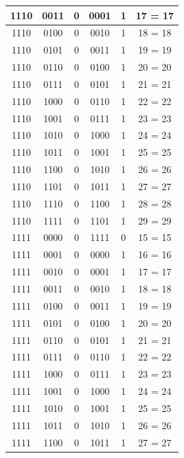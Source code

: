 \documentclass{exam}
\begin{document}
\begin{center}
\begin{longtable}{|c|c|c|c|c|c|}
                1110 & 0011 & 0 & 0001 & 1 & 17 = 17 \\ \hline
                1110 & 0100 & 0 & 0010 & 1 & 18 = 18 \\ \hline
                1110 & 0101 & 0 & 0011 & 1 & 19 = 19 \\ \hline
                1110 & 0110 & 0 & 0100 & 1 & 20 = 20 \\ \hline
                1110 & 0111 & 0 & 0101 & 1 & 21 = 21 \\ \hline
                1110 & 1000 & 0 & 0110 & 1 & 22 = 22 \\ \hline
                1110 & 1001 & 0 & 0111 & 1 & 23 = 23 \\ \hline
                1110 & 1010 & 0 & 1000 & 1 & 24 = 24 \\ \hline
                1110 & 1011 & 0 & 1001 & 1 & 25 = 25 \\ \hline
                1110 & 1100 & 0 & 1010 & 1 & 26 = 26 \\ \hline
                1110 & 1101 & 0 & 1011 & 1 & 27 = 27 \\ \hline
                1110 & 1110 & 0 & 1100 & 1 & 28 = 28 \\ \hline
                1110 & 1111 & 0 & 1101 & 1 & 29 = 29 \\ \hline
                1111 & 0000 & 0 & 1111 & 0 & 15 = 15 \\ \hline
                1111 & 0001 & 0 & 0000 & 1 & 16 = 16 \\ \hline
                1111 & 0010 & 0 & 0001 & 1 & 17 = 17 \\ \hline
                1111 & 0011 & 0 & 0010 & 1 & 18 = 18 \\ \hline
                1111 & 0100 & 0 & 0011 & 1 & 19 = 19 \\ \hline
                1111 & 0101 & 0 & 0100 & 1 & 20 = 20 \\ \hline
                1111 & 0110 & 0 & 0101 & 1 & 21 = 21 \\ \hline
                1111 & 0111 & 0 & 0110 & 1 & 22 = 22 \\ \hline
                1111 & 1000 & 0 & 0111 & 1 & 23 = 23 \\ \hline
                1111 & 1001 & 0 & 1000 & 1 & 24 = 24 \\ \hline
                1111 & 1010 & 0 & 1001 & 1 & 25 = 25 \\ \hline
                1111 & 1011 & 0 & 1010 & 1 & 26 = 26 \\ \hline
                1111 & 1100 & 0 & 1011 & 1 & 27 = 27 \\ \hline

\end{longtable}
\end{center}
\end{document}
